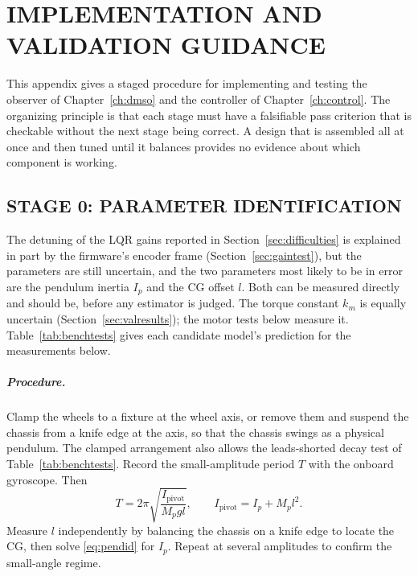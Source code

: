 \chapter{IMPLEMENTATION AND VALIDATION GUIDANCE}
\label{app:validation}

This appendix gives a staged procedure for implementing and testing the observer
of Chapter~\ref{ch:dmso} and the controller of Chapter~\ref{ch:control}. The
organizing principle is that each stage must have a falsifiable pass criterion
that is checkable without the next stage being correct. A design that is
assembled all at once and then tuned until it balances provides no evidence
about which component is working.

\section{STAGE 0: PARAMETER IDENTIFICATION}

The detuning of the LQR gains reported in Section~\ref{sec:difficulties} is
explained in part by the firmware's encoder frame
(Section~\ref{sec:gaintest}), but the parameters are still uncertain, and the
two parameters most likely to be in error are the pendulum inertia $I_p$
and the CG offset $l$. Both can be measured directly and should be, before any
estimator is judged. The torque constant $k_m$ is equally uncertain
(Section~\ref{sec:valresults}); the motor tests below measure it.
Table~\ref{tab:benchtests} gives each candidate model's prediction for the
measurements below.

\paragraph{Procedure.} Clamp the wheels to a fixture at the wheel axis, or
remove them and suspend the chassis from a knife edge at the axis, so that the
chassis swings as a physical pendulum. The clamped arrangement also allows
the leads-shorted decay test of Table~\ref{tab:benchtests}. Record the
small-amplitude period $T$ with the onboard gyroscope. Then
\begin{equation}\label{eq:pendid}
T=2\pi\sqrt{\frac{I_{\mathrm{pivot}}}{M_pgl}},
\qquad
I_{\mathrm{pivot}}=I_p+M_pl^2 .
\end{equation}
Measure $l$ independently by balancing the chassis on a knife edge to locate the
CG, then solve \eqref{eq:pendid} for $I_p$. Repeat at several amplitudes to
confirm the small-angle regime.

